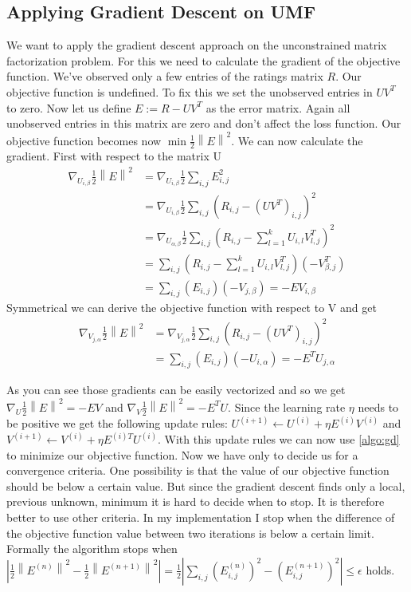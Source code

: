 \documentclass[DIV=14,twocolumn]{scrartcl}
\newcommand{\norm}[1]{\left\lVert#1\right\rVert}
\begin{document}
\subsection{Applying Gradient Descent on UMF} 
We want to apply the gradient descent approach on the unconstrained matrix factorization problem. For this we need to calculate the gradient of the objective function. We've observed only a few entries of the ratings matrix $R$. Our objective function is undefined. To fix this we set the unobserved entries in $UV^T$ to zero. 
Now let us define $E:=R-UV^T$ as the error matrix. Again all unobserved entries in this matrix are zero and don't affect the loss function. Our objective function becomes now $\min\frac{1}{2}\norm{E}^2$.
We can now calculate the gradient.
First with respect to the matrix U
\begin{equation*}
\begin{split}
\nabla_{U_{i,\beta}} \frac{1}{2}\norm{E}^2 &= \nabla_{U_{i,\beta}} \frac{1}{2}\sum_{i,j}E_{i,j}^2 \\ &=\nabla_{U_{i,\beta}} \frac{1}{2}\sum_{i,j}(R_{i,j}-(UV^T)_{i,j})^2 \\
&=\nabla_{U_{\alpha,\beta}} \frac{1}{2}\sum_{i,j}(R_{i,j}-\sum_{l=1}^k U_{i,l}V^T_{l,j})^2\\
&=\sum_{i,j}(R_{i,j}-\sum_{l=1}^k U_{i,l}V^T_{l,j})(-V^T_{\beta,j})\\
&=\sum_{i,j}(E_{i,j})(-V_{j,\beta})=-EV_{i,\beta} 
\end{split}
\end{equation*}
Symmetrical we can derive the objective function with respect to V and get 
\begin{equation*}
\begin{split}
\nabla_{V_{j,\alpha}} \frac{1}{2}\norm{E}^2 &= \nabla_{V_{j,\alpha}} \frac{1}{2}\sum_{i,j}(R_{i,j}-(UV^T)_{i,j})^2\\
&=\sum_{i,j}(E_{i,j})(-U_{i,\alpha})=-E^TU_{j,\alpha}
\end{split}
\end{equation*}

As you can see those gradients can be easily vectorized and so we get $\nabla_U \frac{1}{2}\norm{E}^2=-EV$ and  $\nabla_V \frac{1}{2}\norm{E}^2=-E^TU$. Since the learning rate $\eta$ needs to be positive we get the following update rules: $U^{(i+1)} \leftarrow U^{(i)} + \eta E^{(i)}V^{(i)}$ and $V^{(i+1)} \leftarrow V^{(i)} + \eta E^{(i)T}U^{(i)}$. With this update rules we can now use \ref{algo:gd} to minimize our objective function. Now we have only to decide us for a convergence criteria. One possibility is that the value of our objective function should be below a certain value. But since the gradient descent finds only a local, previous unknown, minimum it is hard to decide when to stop. It is therefore better to use other criteria. In my implementation I stop when the difference of the objective function value between two iterations is below a certain limit. Formally the algorithm stops when $|\frac{1}{2}\norm{E^{(n)}}^2-\frac{1}{2}\norm{E^{(n+1)}}^2|=\frac{1}{2}|\sum_{i,j}(E_{i,j}^{(n)})^2-(E_{i,j}^{(n+1)})^2|\leq\epsilon$ holds.
\end{document}
